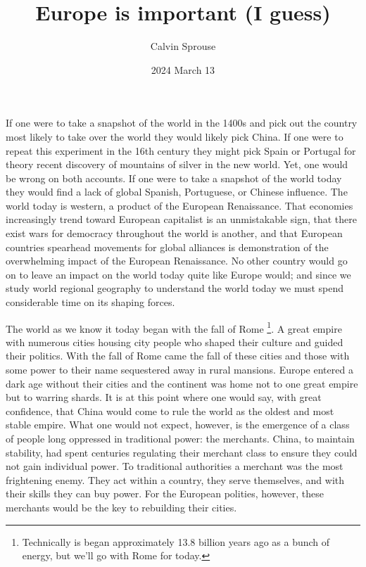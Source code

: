 \documentclass[a4paper, 12pt]{article}
\title{Europe is important (I guess)}
\author{Calvin Sprouse}
\affil{Geography 101 World Regional Geography}
\date{2024 March 13}
\begin{document}
\maketitle

If one were to take a snapshot of the world in the 1400s and pick out the country most likely to take over the world they would likely pick China. If one were to repeat this experiment in the 16th century they might pick Spain or Portugal for theory recent discovery of mountains of silver in the new world. Yet, one would be wrong on both accounts. If one were to take a snapshot of the world today they would find a lack of global Spanish, Portuguese, or Chinese influence. The world today is western, a product of the European Renaissance. That economies increasingly trend toward European capitalist is an unmistakable sign, that there exist wars for democracy throughout the world is another, and that European countries spearhead movements for global alliances is demonstration of the overwhelming impact of the European Renaissance. No other country would go on to leave an impact on the world today quite like Europe would; and since we study world regional geography to understand the world today we must spend considerable time on its shaping forces.

The world as we know it today began with the fall of Rome%
\footnote{Technically is began approximately 13.8 billion years ago as a bunch of energy, but we'll go with Rome for today.}.
A great empire with numerous cities housing city people who shaped their culture and guided their politics. With the fall of Rome came the fall of these cities and those with some power to their name sequestered away in rural mansions. Europe entered a dark age without their cities and the continent was home not to one great empire but to warring shards. It is at this point where one would say, with great confidence, that China would come to rule the world as the oldest and most stable empire. What one would not expect, however, is the emergence of a class of people long oppressed in traditional power: the merchants. China, to maintain stability, had spent centuries regulating their merchant class to ensure they could not gain individual power. To traditional authorities a merchant was the most frightening enemy. They act within a country, they serve themselves, and with their skills they can buy power. For the European polities, however, these merchants would be the key to rebuilding their cities.
\end{document}
